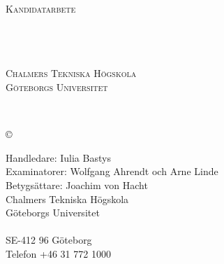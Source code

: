 \newpage
\thispagestyle{empty}
\begin{center}

    \textsc{\large Kandidatarbete \the\year{} }\\[4cm]

    \textbf{\Large \ambaTitle} \\[1cm]

    {\linespread{1.2}\large
    \StrSubstitute{\ambaAuthors}{,}{\\}
    \\ %
    }

    \vfill

    \ambaDepartmentSwedish{} \\
    \textsc{Chalmers Tekniska Högskola} \\
    \textsc{Göteborgs Universitet} \\
    \ambaCityCountryYearSwedish{}
\end{center}


\newpage
{\ambaTitle}\\
\textsc{\ambaAuthors}
\setlength{\parskip}{0.5cm}

\copyright{~\textsc{\ambaAuthors{} \the\year}}
\setlength{\parskip}{1cm}

Handledare: Iulia Bastys \\
Examinatorer: Wolfgang Ahrendt och Arne Linde \\
Betygsättare: Joachim von Hacht \\[1cm]

Chalmers Tekniska Högskola\\
Göteborgs Universitet\\
\ambaDepartmentSwedish{} \\
SE-412 96 Göteborg\\
Telefon +46 31 772 1000 \setlength{\parskip}{0.5cm}

\vfill
\ambaCityCountryYearSwedish{}
